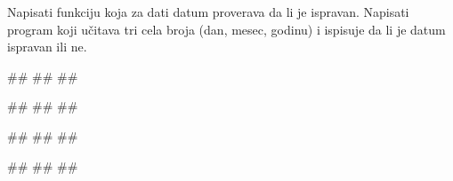 \begin{Exercise}[label=p1.4_] 
Napisati funkciju 
koja za dati datum proverava da li je ispravan. Napisati program koji
učitava tri cela broja (dan, mesec, godinu) i ispisuje da li je datum
ispravan ili ne.

\begin{miditest}
\begin{upotreba}{1}
#\naslovInt#
##
##
\end{upotreba}
\end{miditest}
\begin{miditest}
\begin{upotreba}{2}
#\naslovInt#
##
##
\end{upotreba}
\end{miditest}

\begin{miditest}
\begin{upotreba}{3}
#\naslovInt#
##
##
\end{upotreba}
\end{miditest}
\begin{miditest}
\begin{upotreba}{4}
#\naslovInt#
##
##
\end{upotreba}
\end{miditest}

\end{Exercise}


